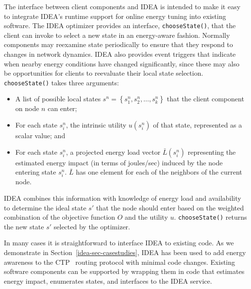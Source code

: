 The interface between client components and IDEA is intended to make it easy
to integrate IDEA's runtime support for online energy tuning into existing
software. The IDEA optimizer provides an interface, \texttt{chooseState()},
that the client can invoke to select a new state in an energy-aware fashion.
Normally components may reexamine state periodically to ensure that they
respond to changes in network dynamics. IDEA also provides event triggers
that indicate when nearby energy conditions have changed significantly, since
these may also be opportunities for clients to reevaluate their local state
selection. \texttt{chooseState()} takes three arguments: \begin{itemize}
\item A list of possible local states $s^n = \left\{ s^n_1, s^n_2, \ldots,
s^n_k\right\}$ that the client component on node $n$ can enter; \item For
each state $s^n_i$, the intrinsic utility $u(s^n_i)$ of that state,
represented as a scalar value; and \item For each state $s^n_i$, a projected
energy load vector $\bar{L}(s^n_i)$ representing the estimated energy impact
(in terms of joules/sec) induced by the node entering state $s^n_i$.
$\bar{L}$ has one element for each of the neighbors of the current node.
\end{itemize} IDEA combines this information with knowledge of energy load
and availability to determine the ideal state $s'$ that the node should enter
based on the weighted combination of the objective function $O$ and the
utility $u$. \texttt{chooseState()} returns the new state $s'$ selected by
the optimizer.

In many cases it is straightforward to interface IDEA to existing code. As we
demonstrate in Section~\ref{idea-sec-casestudies}, IDEA has been used to add
energy awareness to the CTP~\cite{ctp-sensys09} routing protocol with minimal
code changes. Existing software components can be supported by wrapping them
in code that estimates energy impact, enumerates states, and interfaces to
the IDEA service.
